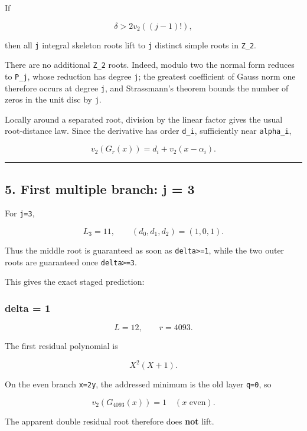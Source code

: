 \documentclass[11pt,letterpaper]{article}
\begin{document}
If

\[
\boxed{
\delta>2v_2((j-1)!),
}
\]

then all \texttt{j} integral skeleton roots lift to \texttt{j} distinct simple roots in \texttt{Z\_2}.

There are no additional \texttt{Z\_2} roots. Indeed, modulo two the normal form reduces to \texttt{P\_j}, whose reduction has degree \texttt{j}; the greatest coefficient of Gauss norm one therefore occurs at degree \texttt{j}, and Strassmann's theorem bounds the number of zeros in the unit disc by \texttt{j}.

Locally around a separated root, division by the linear factor gives the usual root-distance law. Since the derivative has order \texttt{d\_i}, sufficiently near \texttt{alpha\_i},

\[
\boxed{
v_2(G_r(x))=d_i+v_2(x-\alpha_i).}
\]

\begin{center}\rule{0.5\linewidth}{0.5pt}\end{center}

\subsection{5. First multiple branch: j = 3}\label{first-multiple-branch-j-3}

For \texttt{j=3},

\[
L_3=11,
\qquad
(d_0,d_1,d_2)=(1,0,1).
\]

Thus the middle root is guaranteed as soon as \texttt{delta\textgreater{}=1}, while the two outer roots are guaranteed once \texttt{delta\textgreater{}=3}.

This gives the exact staged prediction:

\subsubsection{delta = 1}\label{delta-1}

\[
L=12,
\qquad
r=4093.
\]

The first residual polynomial is

\[
X^2(X+1).
\]

On the even branch \texttt{x=2y}, the addressed minimum is the old layer \texttt{q=0}, so

\[
\boxed{v_2(G_{4093}(x))=1\quad(x\text{ even}).}
\]

The apparent double residual root therefore does \textbf{not} lift.
\end{document}
